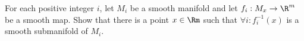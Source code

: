 For each positive integer $i$, let $M_i$ be a smooth manifold and let
$f_i:M_x\rightarrow \R^m$ be a smooth map. Show that there is a point
$x\in \Rm$ such that $\forall i: f_i^{-1}(x)$ is a smooth submanifold
of $M_i$.
